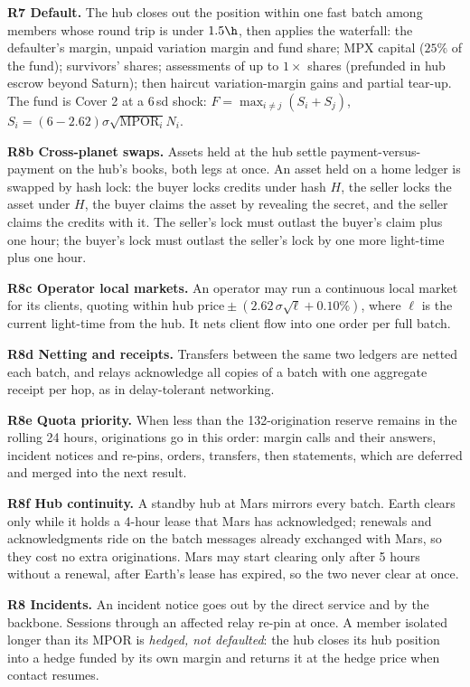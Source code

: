 \textbf{R7 Default.} The hub closes out the position within one fast batch among members whose round trip is under $1.5\h$, then applies the waterfall: the defaulter's margin, unpaid variation margin and fund share; MPX capital ($25\%$ of the fund); survivors' shares; assessments of up to $1\times$ shares (prefunded in hub escrow beyond Saturn); then haircut variation-margin gains and partial tear-up. The fund is Cover 2 \cite{pfmi} at a $6\,$sd shock: $F=\max_{i\ne j}(S_i+S_j)$, $S_i=(6-2.62)\sigma\sqrt{\mathrm{MPOR}_i}N_i$.

\textbf{R8b Cross-planet swaps.} Assets held at the hub settle payment-versus-payment on the hub's books, both legs at once. An asset held on a home ledger is swapped by hash lock: the buyer locks credits under hash $H$, the seller locks the asset under $H$, the buyer claims the asset by revealing the secret, and the seller claims the credits with it. The seller's lock must outlast the buyer's claim plus one hour; the buyer's lock must outlast the seller's lock by one more light-time plus one hour.

\textbf{R8c Operator local markets.} An operator may run a continuous local market for its clients, quoting within $\text{hub price}\pm(2.62\,\sigma\sqrt{\ell}+0.10\%)$, where $\ell$ is the current light-time from the hub. It nets client flow into one order per full batch.

\textbf{R8d Netting and receipts.} Transfers between the same two ledgers are netted each batch, and relays acknowledge all copies of a batch with one aggregate receipt per hop, as in delay-tolerant networking.

\textbf{R8e Quota priority.} When less than the 132-origination reserve remains in the rolling 24 hours, originations go in this order: margin calls and their answers, incident notices and re-pins, orders, transfers, then statements, which are deferred and merged into the next result.

\textbf{R8f Hub continuity.} A standby hub at Mars mirrors every batch. Earth clears only while it holds a 4-hour lease that Mars has acknowledged; renewals and acknowledgments ride on the batch messages already exchanged with Mars, so they cost no extra originations. Mars may start clearing only after 5 hours without a renewal, after Earth's lease has expired, so the two never clear at once.

\textbf{R8 Incidents.} An incident notice goes out by the direct service and by the backbone. Sessions through an affected relay re-pin at once. A member isolated longer than its MPOR is \emph{hedged, not defaulted}: the hub closes its hub position into a hedge funded by its own margin and returns it at the hedge price when contact resumes.
